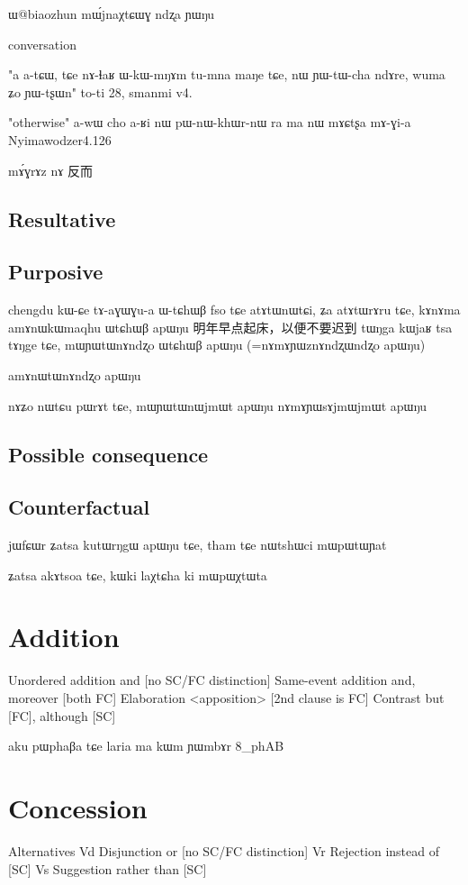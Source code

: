 \documentclass[oldfontcommands,oneside,a4paper,11pt]{memoir}
\newcommand{\wav}[1]{}%
\begin{document}
ɯ@biaozhun mɯ́jnaχtɕɯɣ ndʐa ɲɯŋu
\wav{8_biaozhun}
conversation

"a a-tɕɯ, tɕe nɤ-ɬaʁ ɯ-kɯ-mŋɤm tu-mna maŋe tɕe, nɯ ɲɯ-tɯ-cha ndɤre, wuma ʑo ɲɯ-tʂɯn" to-ti
28, smanmi v4.

"otherwise"
a-wɯ cho a-ʁi nɯ pɯ-nɯ-khɯr-nɯ ra ma nɯ mɤɕtʂa mɤ-ɣi-a
Nyimawodzer4.126




mɤ́ɣrɤz nɤ 反而
\subsection{Resultative}

\subsection{Purposive}
chengdu kɯ-ɕe tɤ-aɣɯɣu-a
ɯ-tɕhɯβ
\xv fso tɕe atɤtɯnɯtɕi, ʑa atɤtɯrɤru tɕe, kɤnɤma amɤnɯkɯmaqhu ɯtɕhɯβ apɯŋu
\xn 明年早点起床，以便不要迟到
\xv tɯŋga kɯjaʁ tsa tɤŋge tɕe, mɯɲɯtɯnɤndʐo ɯtɕhɯβ apɯŋu (=nɤmɤɲɯznɤndʐɯndʐo apɯŋu)

amɤnɯtɯnɤndʐo apɯŋu

\wav{8_WtChWB}

nɤʑo nɯtɕu pɯrɤt tɕe, mɯɲɯtɯnɯjmɯt apɯŋu
nɤmɤɲɯsɤjmɯjmɯt apɯŋu
\wav{8_WtChWB2}
\subsection{Possible consequence}


\subsection{Counterfactual}
jɯfɕɯr ʑatsa kutɯrŋgɯ apɯŋu tɕe, tham tɕe nɯtshɯci mɯpɯtɯɲat

ʑatsa akɤtsoa tɕe, kɯki laχtɕha ki mɯpɯχtɯta

\section{Addition}
Unordered addition and [no SC/FC distinction]
 Same-event addition and, moreover [both FC]
 Elaboration <apposition> [2nd clause is FC]
Contrast but [FC], although [SC]



aku pɯphaβa tɕe laria ma kɯm ɲɯmbɤr
8_phAB
\section{Concession}
Alternatives
Vd Disjunction or [no SC/FC distinction]
Vr Rejection instead of [SC]
Vs Suggestion rather than [SC]
\end{document}
